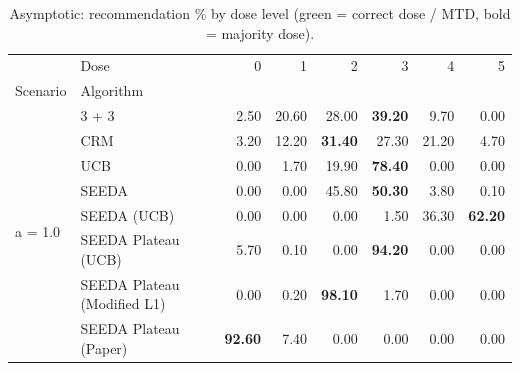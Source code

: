 \begin{table}[H]
\centering
\caption{Asymptotic: recommendation \% by dose level (green = correct dose / MTD, bold = majority dose).}
\label{tab:asym_rec_by_dose}
\begin{tabular}{llrrrrrr}
\toprule
 & Dose & 0 & 1 & 2 & 3 & 4 & 5 \\
Scenario & Algorithm &  &  &  &  &  &  \\
\midrule
\multirow[c]{8}{*}{a = 1.0} & 3 + 3 & 2.50 & 20.60 & {\cellcolor[HTML]{C8E6C9}} 28.00 & \bfseries 39.20 & 9.70 & 0.00 \\
 & CRM & 3.20 & 12.20 & {\cellcolor[HTML]{C8E6C9}} \bfseries 31.40 & 27.30 & 21.20 & 4.70 \\
 & UCB & 0.00 & 1.70 & {\cellcolor[HTML]{C8E6C9}} 19.90 & \bfseries 78.40 & 0.00 & 0.00 \\
 & SEEDA & 0.00 & 0.00 & {\cellcolor[HTML]{C8E6C9}} 45.80 & \bfseries 50.30 & 3.80 & 0.10 \\
 & SEEDA (UCB) & 0.00 & 0.00 & {\cellcolor[HTML]{C8E6C9}} 0.00 & 1.50 & 36.30 & \bfseries 62.20 \\
 & SEEDA Plateau (UCB) & 5.70 & 0.10 & {\cellcolor[HTML]{C8E6C9}} 0.00 & \bfseries 94.20 & 0.00 & 0.00 \\
 & SEEDA Plateau (Modified L1) & 0.00 & 0.20 & {\cellcolor[HTML]{C8E6C9}} \bfseries 98.10 & 1.70 & 0.00 & 0.00 \\
 & SEEDA Plateau (Paper) & \bfseries 92.60 & 7.40 & {\cellcolor[HTML]{C8E6C9}} 0.00 & 0.00 & 0.00 & 0.00 \\
\bottomrule
\end{tabular}
\end{table}
